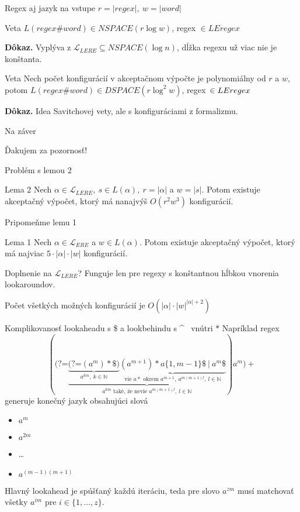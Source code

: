 \documentclass[mathserif]{beamer}
\def\N{\mathds{N}} %
\def\le{LEregex}
\def\el{\mathscr{L}_{ERE}}
\def\lel{\mathscr{L}_{LERE}}
\def\lookahead{\text{(?=}}
\begin{document}
\begin{frame}{Regex aj jazyk na vstupe}
$r=|regex|,~w=|word|$
\begin{block}{Veta}
$L(regex\#word) \in NSPACE(r\log w)$, regex $\in \le$
\end{block}
\textbf{Dôkaz.} Vyplýva z $\lel \subseteq NSPACE(\log n)$, dĺžka regexu už viac nie je konštanta.
\begin{block}{Veta}
Nech počet konfigurácií v akceptačnom výpočte je polynomiálny od $r$ a $w$, potom
$L(regex\#word) \in DSPACE(r\log^2 w)$, regex~$\in \nobreak\le$
\end{block}
\textbf{Dôkaz.} Idea Savitchovej vety, ale s konfiguráciami z formalizmu.
\end{frame}

\begin{frame}{Na záver}
\begin{alertblock}{}
\begin{center}
\vspace{10pt}
\large{Ďakujem za pozornosť!}
\vspace{10pt}
\end{center}
\end{alertblock}
\end{frame}

\begin{frame}{Problém s lemou 2}
\begin{block}{Lema 2}
Nech $\alpha \in \lel,~ s \in L(\alpha),~ r = |\alpha|$ a $w = |s|$. Potom existuje akceptačný výpočet, ktorý má nanajvýš $O(r^2w^3)$ konfigurácií.
\end{block}

\vspace{10pt}
Pripomeňme lemu 1
\begin{block}{Lema 1}
Nech $\alpha \in \el$ a $w \in L(\alpha)$. Potom existuje akceptačný výpočet, ktorý má najviac $5\cdot|\alpha|\cdot|w|$ konfigurácií.
\end{block}
Doplnenie na $\lel$? Funguje len pre regexy s konštantnou hĺbkou vnorenia lookaroundov.

\vspace{5pt}
Počet všetkých možných konfigurácií je $O(|\alpha|\cdot|w|^{|\alpha|+2})$
\end{frame}

\begin{frame}{Komplikovanosť lookaheadu s \$ a lookbehindu s \textasciicircum ~ vnútri $*$}
Napríklad regex
$$(\lookahead \underbrace{
 \underbrace{ \lookahead (a^m)*\$ )}_{a^{km},~ k\in\N} 
 \underbrace{(a^{m+1})* a\lbrace 1,m-1\rbrace \$ ~|~ a^m \$ }_{\text{vie } a* \text{ okrem } a^{m+1},~a^{m(m+1)l},~ l\in\N} 
 }_{a^{km} \text{ také, že nevie } a^{m(m+1)l}, ~l\in\N }
  ) a^m)+$$
generuje konečný jazyk obsahujúci slová 
\begin{itemize}
\item $a^m$
\item $a^{2m}$
\item \dots
\item $a^{(m-1)(m+1)}$
\end{itemize} 
Hlavný lookahead je spúšťaný každú iteráciu, teda pre slovo $a^{zm}$ musí matchovať všetky $a^{im}$ pre $i\in\lbrace 1,\dots,z\rbrace$.
\end{frame}
\end{document}
